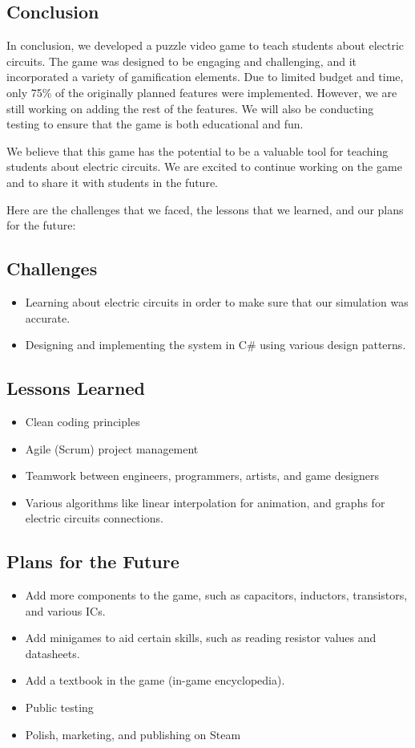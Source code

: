 \documentclass[twoside,a4paper,11pt]{article}
\begin{document}
\begin{multicols}{2}
  

 \section{Conclusion}
 In conclusion, we developed a puzzle video game to teach students about electric circuits. The game was designed to be engaging and challenging, and it incorporated a variety of gamification elements. Due to limited budget and time, only 75\% of the originally planned features were implemented. However, we are still working on adding the rest of the features. We will also be conducting testing to ensure that the game is both educational and fun.
 
 We believe that this game has the potential to be a valuable tool for teaching students about electric circuits. We are excited to continue working on the game and to share it with students in the future.
 
 Here are the challenges that we faced, the lessons that we learned, and our plans for the future:
 
 \subsection*{Challenges}
 \begin{itemize}
    \item Learning about electric circuits in order to make sure that our simulation was accurate.
    \item Designing and implementing the system in C\# using various design patterns.
\end{itemize}
\subsection*{Lessons Learned}
\begin{itemize}
     \item Clean coding principles
     \item Agile (Scrum) project management
     \item Teamwork between engineers, programmers, artists, and game designers
     \item Various algorithms like linear interpolation for animation, and graphs for electric circuits connections.
\end{itemize}
\subsection*{Plans for the Future}
\begin{itemize}
     \item Add more components to the game, such as capacitors, inductors, transistors, and various ICs.
     \item Add minigames to aid certain skills, such as reading resistor values and datasheets.
     \item Add a textbook in the game (in-game encyclopedia).
     \item Public testing
     \item Polish, marketing, and publishing on Steam
 \end{itemize}
 

\end{multicols}
\end{document}
